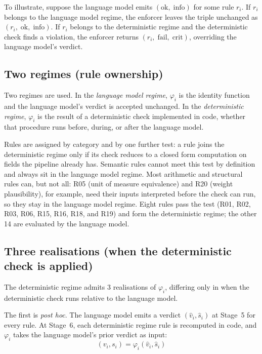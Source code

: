 To illustrate, suppose the language model emits $(\text{ok},\; \text{info})$ for some rule $r_i$. If $r_i$ belongs to the language model regime, the enforcer leaves the triple unchanged as $(r_i,\; \text{ok},\; \text{info})$. If $r_i$ belongs to the deterministic regime and the deterministic check finds a violation, the enforcer returns $(r_i,\; \text{fail},\; \text{crit})$, overriding the language model's verdict.

\subsection{Two regimes (rule ownership)}
\label{sec:method:enforcer:regimes}

Two regimes are used. In the \emph{language model regime}, $\varphi_i$ is the identity function and the language model's verdict is accepted unchanged. In the \emph{deterministic regime}, $\varphi_i$ is the result of a deterministic check implemented in code, whether that procedure runs before, during, or after the language model.

Rules are assigned by category and by one further test: a rule joins the deterministic regime only if its check reduces to a closed form computation on fields the pipeline already has. Semantic rules cannot meet this test by definition and always sit in the language model regime. Most arithmetic and structural rules can, but not all: R05 (unit of measure equivalence) and R20 (weight plausibility), for example, need their inputs interpreted before the check can run, so they stay in the language model regime. Eight rules pass the test (R01, R02, R03, R06, R15, R16, R18, and R19) and form the deterministic regime; the other 14 are evaluated by the language model.

\subsection{Three realisations (when the deterministic check is applied)}
\label{sec:method:enforcer:realisations}

The deterministic regime admits 3 realisations of $\varphi_i$, differing only in when the deterministic check runs relative to the language model.

The first is \emph{post hoc}. The language model emits a verdict $(\hat{v}_i, \hat{s}_i)$ at Stage~5 for every rule. At Stage~6, each deterministic regime rule is recomputed in code, and $\varphi_i$ takes the language model's prior verdict as input:
%
\begin{equation}\label{eq:posthoc}
  (v_i, s_i) = \varphi_i(\hat{v}_i, \hat{s}_i)
\end{equation}

